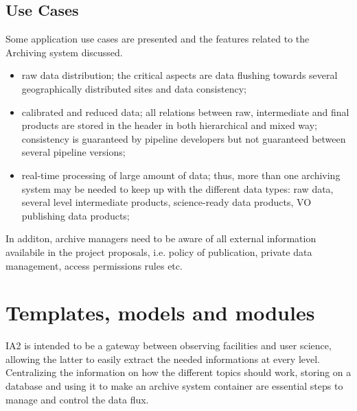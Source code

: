 \documentclass[11pt,twoside]{article}
\begin{document}
\subsection{Use Cases}
Some application use cases are presented and the features related to the
Archiving system discussed.
\begin{itemize}
  \item raw data distribution; the critical aspects are data flushing towards
  several geographically distributed sites and data consistency;  
  \item calibrated and reduced data; all relations between raw, intermediate
  and final products are stored in the header in both hierarchical and mixed way;
  consistency is guaranteed by pipeline developers but not guaranteed between
  several pipeline versions; 
  \item real-time processing of large amount of data; thus, more than one archiving
  system may be needed to keep up with the different data types: raw data,
  several level intermediate products, science-ready data products, VO publishing
  data products;
\end{itemize}
In additon, archive managers need to be aware of all external information
availabile in the project proposals, i.e. policy of publication, private
data management, access permissions rules etc. 

\section{Templates, models and modules}
IA2 is intended to be a gateway between observing facilities and user science,
allowing the latter to easily extract the needed informations at every level.
Centralizing the information on how the different topics should work, storing
on a database and using it to make an archive system container are essential
steps to manage and control the data flux.
\end{document}
